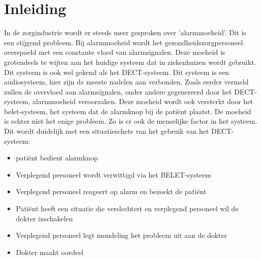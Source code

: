 


% 

\section{Inleiding}%
\label{sec:inleiding}

In de zorgindustrie wordt er steeds meer gesproken over 'alarmmoeheid'. Dit is een stijgend probleem. Bij alarmmoeheid wordt het gezondheidszorgpersoneel overspoeld met een constante vloed van alarmsignalen. Deze moeheid is grotendeels te wijten aan het huidige systeem dat in ziekenhuizen wordt gebruikt. Dit systeem is ook wel gekend als het DECT-systeem. Dit systeem is een audiosysteem, hier zijn de meeste nadelen aan verbonden. Zoals eerder vermeld zullen de overvloed aan alarmsignalen, onder andere gegenereerd door het DECT-systeem, alarmmoeheid veroorzaken. Deze moeheid wordt ook versterkt door het belet-systeem, het systeem dat de alarmknop bij de patiënt plaatst. De moeheid is echter niet het enige probleem. Zo is er ook de menselijke factor in het systeem. Dit wordt duidelijk met een situatieschets van het gebruik van het DECT-systeem:

\begin{itemize}
  \item patiënt bedient alarmknop
  \item Verplegend personeel wordt verwittigd via het BELET-systeem
  \item Verplegend personeel reageert op alarm en bezoekt de patiënt
  \item Patiënt heeft een situatie die verslechtert en verplegend personeel wil de dokter inschakelen
  \item Verplegend personeel legt mondeling het probleem uit aan de dokter
  \item Dokter maakt oordeel
\end{itemize}

